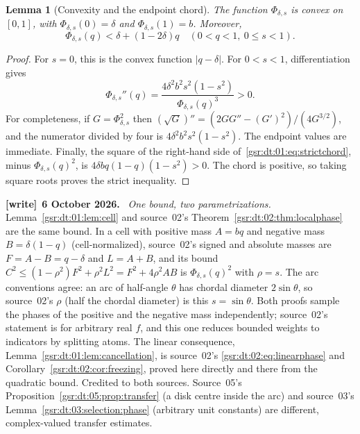 \documentclass[11pt,letterpaper]{article}
\numberwithin{equation}{section}
\newtheorem{lemma}[theorem]{Lemma}
\theoremstyle{definition}
\theoremstyle{remark}
\newcommand{\1}{\mathbf 1}
\newcommand{\ph}{\Phi_{\delta,s}}
\newenvironment{writenote}[1][]{\par\smallskip\begingroup\small
 \noindent\textbf{[write]}\if\relax\detokenize{#1}\relax\else~\textbf{#1.}\fi\ }%
 {\par\endgroup\smallskip}
\begin{document}
\begin{lemma}[Convexity and the endpoint chord]\label{gsr:dt:01:lem:convex}
The function $\ph$ is convex on $[0,1]$, with
$\ph(0)=\delta$ and $\ph(1)=b$. Moreover,
\begin{equation}\label{gsr:dt:01:eq:strictchord}
 \ph(q)<\delta+(1-2\delta)q\quad(0<q<1,
 \ 0\le s<1).
\end{equation}
\end{lemma}
\begin{proof}
For $s=0$, this is the convex function $|q-\delta|$.
For $0<s<1$, differentiation gives
\begin{equation}\label{gsr:dt:01:eq:curvature}
 \ph''(q)=\frac{4\delta^2b^2s^2(1-s^2)}{\ph(q)^3}>0.
\end{equation}
For completeness, if $G=\ph^2$ then
$(\sqrt G)''=(2GG''-(G')^2)/(4G^{3/2})$, and the numerator divided by
four is $4\delta^2b^2s^2(1-s^2)$.
The endpoint values are immediate. Finally, the square of the right-hand
side of~\eqref{gsr:dt:01:eq:strictchord}, minus $\ph(q)^2$, is
$4\delta bq(1-q)(1-s^2)>0$. The chord is positive, so taking square
roots proves the strict inequality.
\end{proof}
\begin{writenote}[6 October 2026]
\emph{One bound, two parametrizations.} Lemma~\ref{gsr:dt:01:lem:cell} and source~02's Theorem~\ref{gsr:dt:02:thm:localphase} are the same bound. In a cell with positive mass $A=bq$ and negative mass $B=\delta(1-q)$ (cell-normalized), source~02's signed and absolute masses are $F=A-B=q-\delta$ and $L=A+B$, and its bound $C^2\le(1-\rho^2)F^2+\rho^2L^2=F^2+4\rho^2AB$ is $\ph(q)^2$ with $\rho=s$. The arc conventions agree: an arc of half-angle $\theta$ has chordal diameter $2\sin\theta$, so source~02's $\rho$ (half the chordal diameter) is this $s=\sin\theta$. Both proofs sample the phases of the positive and the negative mass independently; source~02's statement is for arbitrary real $f$, and this one reduces bounded weights to indicators by splitting atoms. The linear consequence, Lemma~\ref{gsr:dt:01:lem:cancellation}, is source~02's \eqref{gsr:dt:02:eq:linearphase} and Corollary~\ref{gsr:dt:02:cor:freezing}, proved here directly and there from the quadratic bound. Credited to both sources. Source~05's Proposition~\ref{gsr:dt:05:prop:transfer} (a disk centre inside the arc) and source~03's Lemma~\ref{gsr:dt:03:selection:phase} (arbitrary unit constants) are different, complex-valued transfer estimates.
\end{writenote}
\end{document}
